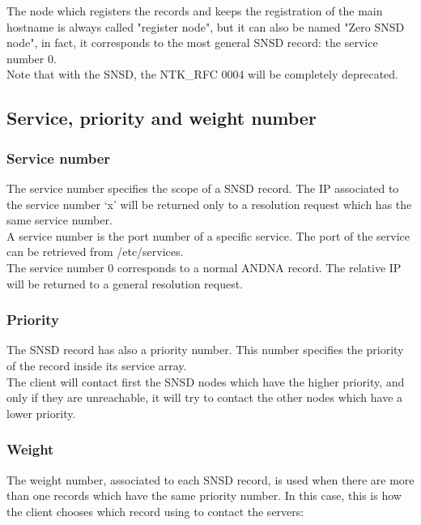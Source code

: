 \documentclass[a4paper]{article}
\begin{document}
The node which registers the records and keeps the registration of the main
hostname is always called "register node", but it can also be named "Zero SNSD
node", in fact, it corresponds to the most general SNSD record: the service
number 0.\\
  
Note that with the SNSD, the NTK\_RFC 0004 will be completely deprecated.

\subsection{Service, priority and weight number}

\subsubsection{Service number}
  
The service number specifies the scope of a SNSD record. The IP associated to 
the service number `x' will be returned only to a resolution request which has
the same service number.\\
  
A service number is the port number of a specific service. The port of the
service can be retrieved from /etc/services.\\
  
The service number 0 corresponds to a normal ANDNA record. The relative IP
will be returned to a general resolution request.\\
  
\subsubsection{Priority}
  
The SNSD record has also a priority number. This number specifies the priority
of the record inside its service array.\\
The client will contact first the SNSD nodes which have the higher priority,
and only if they are unreachable, it will try to contact the other nodes
which have a lower priority.
  
\subsubsection{Weight}
  
The weight number, associated to each SNSD record, is used when there are
more than one records which have the same priority number.
In this case, this is how the client chooses which record using to contact
the servers:\\
  
\end{document}
